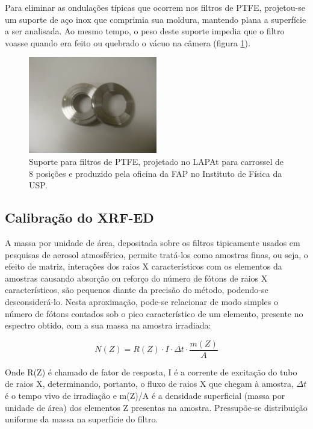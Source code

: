 Para eliminar as ondulações típicas que ocorrem nos filtros de PTFE, 
projetou-se um suporte de aço inox que comprimia sua moldura, mantendo plana 
a superfície a ser analisada. Ao mesmo tempo, o peso deste suporte impedia que 
o filtro voasse quando era feito ou quebrado o vácuo na câmera 
(figura \ref{fig:suporte8}).

\begin{figure}[H]
  \centering
  \includegraphics[width=0.5\textwidth]{../inputs/images/suporte8.jpg}
  \caption{Suporte para filtros de PTFE, projetado no LAPAt para carrossel de 
           8 posições e produzido pela oficina da FAP no 
           Instituto de Física da USP. \label{fig:suporte8}}
\end{figure}

\subsection{Calibração do XRF-ED}

A massa por unidade de área, depositada sobre os filtros tipicamente usados em 
pesquisas de aerosol atmosférico, permite tratá-los como amostras finas,
ou seja, o efeito de matriz, interações dos raios X característicos com os 
elementos da amostras causando absorção ou reforço do número de fótons de 
raios X característicos, são pequenos diante da precisão do método,
podendo-se desconsiderá-lo. Nesta aproximação, pode-se relacionar de modo 
simples o número de fótons contados sob o pico característico de um elemento, 
presente no espectro obtido, com a sua massa na amostra irradiada:

\begin{equation}
  \label{eq:contagem}
  N(Z) = R(Z) \cdot I \cdot \Delta t  \cdot \frac{m(Z)}{A}
\end{equation}

Onde R(Z) é chamado de fator de resposta, I é a corrente de excitação do tubo 
de raios X, determinando, portanto, o fluxo de raios X que chegam à amostra, 
$\Delta t$ é o tempo vivo de irradiação e m(Z)/A é a densidade superficial
(massa por unidade de área) dos elementos Z presentas na amostra. 
Pressupõe-se distribuição uniforme da massa na superfície do filtro.

